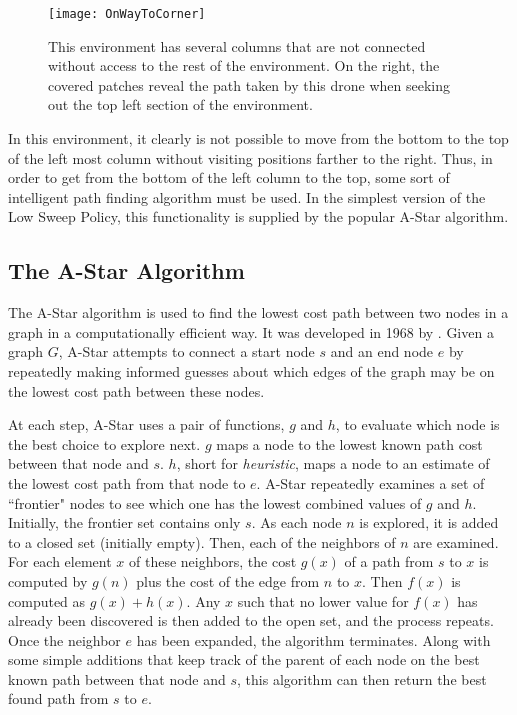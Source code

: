 \begin{figure}[H]
\texttt{[image: OnWayToCorner]}
\caption[Environment with non-continuous columns]{This environment has several columns that are not connected without access to the rest of the environment. On the right, the covered patches reveal the path taken by this drone when seeking out the top left section of the environment.}
\end{figure}

In this environment, it clearly is not possible to move from the bottom to the top of the left most column without visiting positions farther to the right. Thus, in order to get from the bottom of the left column to the top, some sort of intelligent path finding algorithm must be used. In the simplest version of the Low Sweep Policy, this functionality is supplied by the popular A-Star algorithm.

\subsection{The A-Star Algorithm}

The A-Star algorithm is used to find the lowest cost path between two nodes in a graph in a computationally efficient way. It was developed in 1968 by \citeauthor{A-Star} \cite{A-Star}. Given a graph $ G $, A-Star attempts to connect a start node $s$ and an end node $e$ by repeatedly making informed guesses about which edges of the graph may be on the lowest cost path between these nodes.

At each step, A-Star uses a pair of functions, $g$ and $h$, to evaluate which node is the best choice to explore next. $g$ maps a node to the lowest known path cost between that node and $s$. $h$, short for \textit{heuristic}, maps a node to an estimate of the lowest cost path from that node to $e$. A-Star repeatedly examines a set of ``frontier" nodes to see which one has the lowest combined values of $g$ and $h$. Initially, the frontier set contains only $s$. As each node $n$ is explored, it is added to a closed set (initially empty). Then, each of the neighbors of $n$ are examined. For each element $x$ of these neighbors, the cost $g(x)$ of a path from $s$ to $x$ is computed by $g(n)$ plus the cost of the edge from $n$ to $x$. Then $f(x)$ is computed as $g(x) + h(x)$. Any $x$ such that no lower value for $f(x)$ has already been discovered is then added to the open set, and the process repeats. Once the neighbor $e$ has been expanded, the algorithm terminates. Along with some simple additions that keep track of the parent of each node on the best known path between that node and $s$, this algorithm can then return the best found path from $s$ to $e$. 

